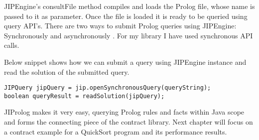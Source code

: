 JIPEngine's consultFile method compiles and loads the Prolog file, whose name is passed to it as parameter. Once the file is loaded it is ready to be queried using query API's. There are two ways to submit Prolog queries using JIPEngine: Synchronously and asynchronously \cite{JIProlog}. For my library I have used synchronous API calls. 

\begin{minipage}{\linewidth}
Below snippet shows how we can submit a query using JIPEngine instance and read the solution of the submitted query.

\lstset{language=Java,caption= Prolog Query Using JIProlog API, captionpos=b, breaklines=true}       
\begin{lstlisting}[frame=single]
JIPQuery jipQuery = jip.openSynchronousQuery(queryString);
boolean queryResult = readSolution(jipQuery);
\end{lstlisting}
\end{minipage}

JIProlog makes it very easy, querying Prolog rules and facts within Java scope and forms the connecting piece of the contract library. Next chapter will focus on a contract example for a QuickSort program and its performance results.

 